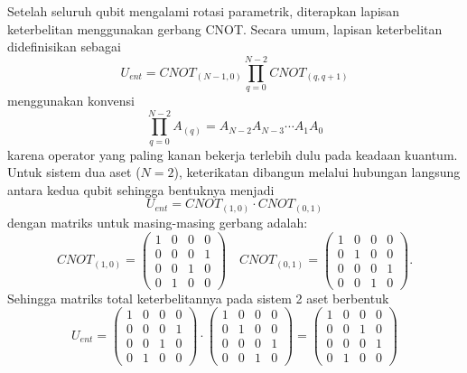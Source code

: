Setelah seluruh qubit mengalami rotasi parametrik, diterapkan lapisan keterbelitan menggunakan gerbang CNOT. Secara umum, lapisan keterbelitan didefinisikan sebagai
\begin{equation}
\label{eq:entanglement_layer}
U_{ent} = CNOT_{(N-1,0)} \prod_{q=0}^{N-2} CNOT_{(q,q+1)}
\end{equation}
menggunakan konvensi
\begin{equation}
\prod_{q=0}^{N-2} A_{(q)}=A_{N-2}A_{N-3}\cdots A_{1}A_{0}
\end{equation}
karena operator yang paling kanan bekerja terlebih dulu pada keadaan kuantum. Untuk sistem dua aset (\(N=2\)), keterikatan dibangun melalui hubungan langsung antara kedua qubit sehingga bentuknya menjadi
\begin{equation}
U_{ent} = CNOT_{(1,0)} \cdot CNOT_{(0,1)}
\end{equation}
dengan matriks untuk masing-masing gerbang adalah:
\begin{equation}
CNOT_{(1,0)} = \begin{pmatrix} 1 & 0 & 0 & 0 \\ 0 & 0 & 0 & 1 \\ 0 & 0 & 1 & 0 \\ 0 & 1 & 0 & 0 \end{pmatrix} \quad CNOT_{(0,1)} = \begin{pmatrix} 1 & 0 & 0 & 0 \\ 0 & 1 & 0 & 0 \\ 0 & 0 & 0 & 1 \\ 0 & 0 & 1 & 0 \end{pmatrix}.
\end{equation}
Sehingga matriks total keterbelitannya pada sistem 2 aset berbentuk
\begin{equation}
U_{ent} = \begin{pmatrix} 1 & 0 & 0 & 0 \\ 0 & 0 & 0 & 1 \\ 0 & 0 & 1 & 0 \\ 0 & 1 & 0 & 0 \end{pmatrix} \cdot \begin{pmatrix} 1 & 0 & 0 & 0 \\ 0 & 1 & 0 & 0 \\ 0 & 0 & 0 & 1 \\ 0 & 0 & 1 & 0 \end{pmatrix} = \begin{pmatrix} 1 & 0 & 0 & 0 \\ 0 & 0 & 1 & 0 \\ 0 & 0 & 0 & 1 \\ 0 & 1 & 0 & 0 \end{pmatrix}
\end{equation}
